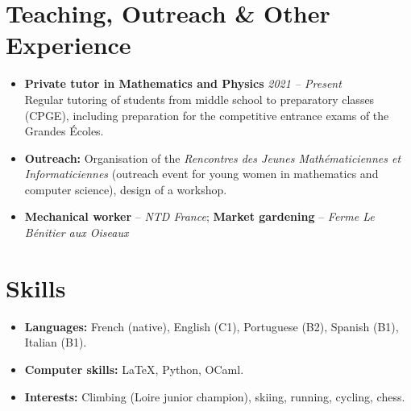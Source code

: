 \documentclass[11pt,a4paper]{article}
\begin{document}
	\section*{Teaching, Outreach \& Other Experience}
	\begin{itemize}[leftmargin=1em, label={}]
		\item \textbf{Private tutor in Mathematics and Physics} \hfill \textit{2021 -- Present} \\
		Regular tutoring of students from middle school to preparatory classes (CPGE), including preparation for the competitive entrance exams of the Grandes Écoles.
		\vspace{0.02cm}
		
		\item \textbf{Outreach:} Organisation of the \emph{Rencontres des Jeunes Mathématiciennes et Informaticiennes} (outreach event for young women in mathematics and computer science), design of a workshop.
		\vspace{0.02cm}
		
		\item \textbf{Mechanical worker} -- \textit{NTD France}; \textbf{Market gardening} -- \textit{Ferme Le Bénitier aux Oiseaux}
	\end{itemize}
	
	\section*{Skills}
	\begin{itemize}[leftmargin=1.5em, label=\textbullet, itemsep=2pt]
		\item \textbf{Languages:} French (native), English (C1), Portuguese (B2), Spanish (B1), Italian (B1).
		\item \textbf{Computer skills:} \LaTeX, Python, OCaml.
		\item \textbf{Interests:} Climbing (Loire junior champion), skiing, running, cycling, chess.
	\end{itemize}
	
\end{document}
